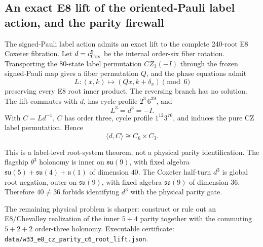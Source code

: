\subsection{An exact E8 lift of the oriented-Pauli label action, and the parity firewall}
\label{sec:20260918-e8-cz-parity-root-lift}

The signed-Pauli label action admits an exact lift to the complete 240-root E8 Coxeter fibration.
Let $d=c_{\rm Cox}^5$ be the internal order-six fiber rotation. Transporting the
$80$-state label permutation $CZ_3(-I)$ through the frozen signed-Pauli map gives a
fiber permutation $Q$, and the phase equations admit
\[L:(x,k)\mapsto(Qx,k+\delta_x)\pmod6\]
preserving every E8 root inner product. The reversing branch has no solution.
The lift commutes with $d$, has cycle profile $2^3\,6^{39}$, and
\[L^3=d^3=-I.\]
With $C=Ld^{-1}$, $C$ has order three, cycle profile $1^{12}3^{76}$, and induces
the pure CZ label permutation. Hence
\[\langle d,C\rangle\cong C_6\times C_3.\]

This is a label-level root-system theorem, not a physical parity identification.
The flagship $\theta^3$ holonomy is inner on $\mathfrak{su}(9)$, with fixed algebra
$\mathfrak{su}(5){+}\mathfrak{su}(4){+}\mathfrak{u}(1)$ of dimension $40$. The Coxeter half-turn $d^3$ is global root
negation, outer on $\mathfrak{su}(9)$, with fixed algebra $\mathfrak{so}(9)$ of dimension $36$.
Therefore $40\neq36$ forbids identifying $d^3$ with the physical parity gate.

The remaining physical problem is sharper: construct or rule out an E8/Chevalley
realization of the inner $5{+}4$ parity together with the commuting $5{+}2{+}2$
order-three holonomy. Executable certificate:
\texttt{data/w33\_e8\_cz\_parity\_c6\_root\_lift.json}.